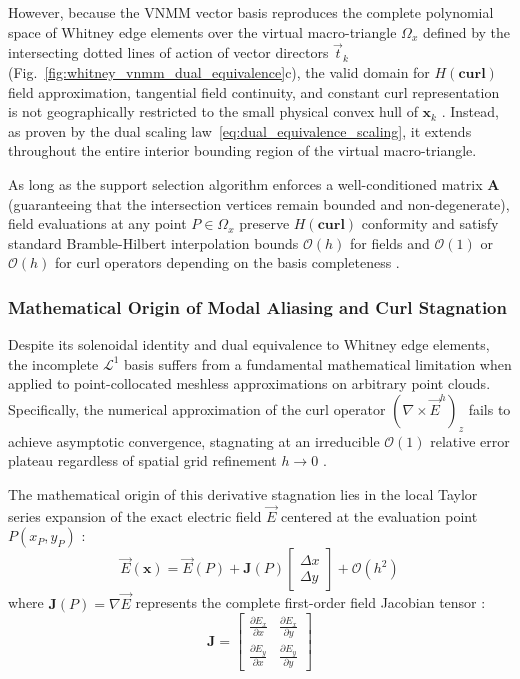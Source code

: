\documentclass[preprint,12pt]{elsarticle}
\begin{document}
However, because the VNMM vector basis reproduces the complete polynomial space of Whitney edge elements over the virtual macro-triangle $\Omega_{x}$ defined by the intersecting dotted lines of action of vector directors $\vec{t}_k$ (Fig.~\ref{fig:whitney_vnmm_dual_equivalence}c), the valid domain for $H(\mathbf{curl})$ field approximation, tangential field continuity, and constant curl representation is not geographically restricted to the small physical convex hull of $\mathbf{x}_k$ \cite{nedelec1980mixed, monk2003finite}. Instead, as proven by the dual scaling law~\eqref{eq:dual_equivalence_scaling}, it extends throughout the entire interior bounding region of the virtual macro-triangle. 

As long as the support selection algorithm enforces a well-conditioned matrix $\mathbf{A}$ (guaranteeing that the intersection vertices remain bounded and non-degenerate), field evaluations at any point $P \in \Omega_{x}$ preserve $H(\mathbf{curl})$ conformity and satisfy standard Bramble-Hilbert interpolation bounds $\mathcal{O}(h)$ for fields and $\mathcal{O}(1)$ or $\mathcal{O}(h)$ for curl operators depending on the basis completeness \cite{monk2003finite}.

\subsubsection{Mathematical Origin of Modal Aliasing and Curl Stagnation}
\label{subsec:L1_aliasing_analysis}

Despite its solenoidal identity and dual equivalence to Whitney edge elements, the incomplete $\mathcal{L}^1$ basis suffers from a fundamental mathematical limitation when applied to point-collocated meshless approximations on arbitrary point clouds. Specifically, the numerical approximation of the curl operator $(\nabla \times \vec{E}^h)_z$ fails to achieve asymptotic convergence, stagnating at an irreducible $\mathcal{O}(1)$ relative error plateau regardless of spatial grid refinement $h \to 0$ \cite{goncalves2025tese}.

The mathematical origin of this derivative stagnation lies in the local Taylor series expansion of the exact electric field $\vec{E}$ centered at the evaluation point $P(x_P, y_P)$ \cite{li2007meshfree, liu2009mesh}:
\begin{equation}
\vec{E}(\mathbf{x}) = \vec{E}(P) + \mathbf{J}(P) \begin{bmatrix} \Delta x \\[2pt] \Delta y \end{bmatrix} + \mathcal{O}(h^2)
\label{eq:taylor_vector_expansion}
\end{equation}
where $\mathbf{J}(P) = \nabla \vec{E}$ represents the complete first-order field Jacobian tensor \cite{liu2009mesh}:
\begin{equation}
\mathbf{J} = \begin{bmatrix} 
\frac{\partial E_x}{\partial x} & \frac{\partial E_x}{\partial y} \\[4pt]
\frac{\partial E_y}{\partial x} & \frac{\partial E_y}{\partial y} 
\end{bmatrix}
\label{eq:jacobian_tensor_raw}
\end{equation}
\end{document}
